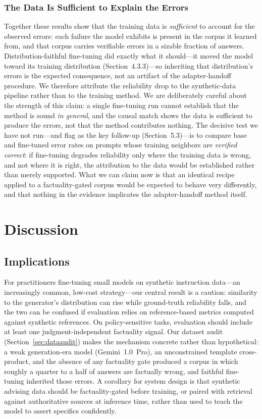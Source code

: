 \documentclass[11pt, a4paper]{article}
\begin{document}
\subsubsection{The Data Is Sufficient to Explain the Errors}
Together these results show that the training data is \emph{sufficient} to account for the observed errors: each failure the model exhibits is present in the corpus it learned from, and that corpus carries verifiable errors in a sizable fraction of answers. Distribution-faithful fine-tuning did exactly what it should---it moved the model toward its training distribution (Section~4.3.3)---so inheriting that distribution's errors is the expected consequence, not an artifact of the adapter-handoff procedure. We therefore attribute the reliability drop to the synthetic-data pipeline rather than to the training method. We are deliberately careful about the strength of this claim: a single fine-tuning run cannot establish that the method is sound \emph{in general}, and the causal match shows the data is sufficient to produce the errors, not that the method contributes nothing. The decisive test we have not run---and flag as the key follow-up (Section~5.3)---is to compare base and fine-tuned error rates on prompts whose training neighbors are \emph{verified correct}: if fine-tuning degrades reliability only where the training data is wrong, and not where it is right, the attribution to the data would be established rather than merely supported. What we can claim now is that an identical recipe applied to a factuality-gated corpus would be expected to behave very differently, and that nothing in the evidence implicates the adapter-handoff method itself.

\section{Discussion}

\subsection{Implications}
For practitioners fine-tuning small models on synthetic instruction data---an increasingly common, low-cost strategy---our central result is a caution: similarity to the generator's distribution can rise while ground-truth reliability falls, and the two can be confused if evaluation relies on reference-based metrics computed against synthetic references. On policy-sensitive tasks, evaluation should include at least one judgment-independent factuality signal. Our dataset audit (Section~\ref{sec:dataaudit}) makes the mechanism concrete rather than hypothetical: a weak generation-era model (Gemini~1.0~Pro), an unconstrained template cross-product, and the absence of any factuality gate produced a corpus in which roughly a quarter to a half of answers are factually wrong, and faithful fine-tuning inherited those errors. A corollary for system design is that synthetic advising data should be factuality-gated before training, or paired with retrieval against authoritative sources at inference time, rather than used to teach the model to assert specifics confidently.
\end{document}
